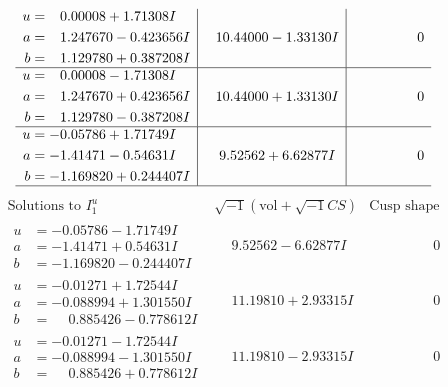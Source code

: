 \documentclass[1p]{elsarticle_modified}
\theoremstyle{definition}
\newcommand{\I}{\sqrt{-1}}
\begin{document}
$$\begin{array}{c|c|c}
\begin{aligned}
u &= \phantom{-}0.00008 + 1.71308 I \\
a &= \phantom{-}1.247670 - 0.423656 I \\
b &= \phantom{-}1.129780 + 0.387208 I\end{aligned}
 & \phantom{-}10.44000 - 1.33130 I & \phantom{-0.000000 } 0 \\ \hline\begin{aligned}
u &= \phantom{-}0.00008 - 1.71308 I \\
a &= \phantom{-}1.247670 + 0.423656 I \\
b &= \phantom{-}1.129780 - 0.387208 I\end{aligned}
 & \phantom{-}10.44000 + 1.33130 I & \phantom{-0.000000 } 0 \\ \hline\begin{aligned}
u &= -0.05786 + 1.71749 I \\
a &= -1.41471 - 0.54631 I \\
b &= -1.169820 + 0.244407 I\end{aligned}
 & \phantom{-}9.52562 + 6.62877 I & \phantom{-0.000000 } 0\\
 \hline 
 \end{array}$$\newpage$$\begin{array}{c|c|c}  
\text{Solutions to }I^u_{1}& \I (\text{vol} + \sqrt{-1}CS) & \text{Cusp shape}\\
 \hline 
\begin{aligned}
u &= -0.05786 - 1.71749 I \\
a &= -1.41471 + 0.54631 I \\
b &= -1.169820 - 0.244407 I\end{aligned}
 & \phantom{-}9.52562 - 6.62877 I & \phantom{-0.000000 } 0 \\ \hline\begin{aligned}
u &= -0.01271 + 1.72544 I \\
a &= -0.088994 + 1.301550 I \\
b &= \phantom{-}0.885426 - 0.778612 I\end{aligned}
 & \phantom{-}11.19810 + 2.93315 I & \phantom{-0.000000 } 0 \\ \hline\begin{aligned}
u &= -0.01271 - 1.72544 I \\
a &= -0.088994 - 1.301550 I \\
b &= \phantom{-}0.885426 + 0.778612 I\end{aligned}
 & \phantom{-}11.19810 - 2.93315 I & \phantom{-0.000000 } 0 \\ \hline\begin{aligned}

\end{aligned}
\end{array}$$
\end{document}
